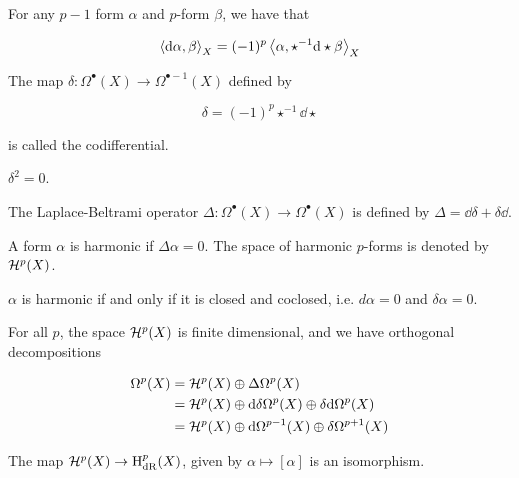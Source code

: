 \begin{lemma}
    For any \(p-1\) form \(\alpha\) and \(p\)-form \(\beta\), we have that

    \[\left\langle \dd\alpha, \beta \right\rangle_X = (-1)^p\left\langle \alpha, \star^{-1}\dd\star\beta \right\rangle_X\]
\end{lemma}

\begin{definition}
    [codifferential] The map \(\delta : \Omega^\bullet(X) \to \Omega^{\bullet-1}(X)\) defined by

    \[\delta = (-1)^p\star^{-1}\dd \star\]

    is called the codifferential.
\end{definition}

\begin{lemma}
    \(\delta^2 = 0\).
\end{lemma}

\begin{definition}
     The Laplace-Beltrami operator \(\Delta : \Omega^\bullet(X) \to \Omega^\bullet(X)\) is defined by \(\Delta = \dd\delta + \delta\dd\).

    A form \(\alpha\) is harmonic if \(\Delta\alpha = 0\). The space of harmonic \(p\)-forms is denoted by \(\mathcal{H}^p(X)\).
\end{definition}

\begin{lemma}
    \(\alpha\) is harmonic if and only if it is closed and coclosed, i.e. \(d\alpha = 0\) and \(\delta\alpha = 0\).
\end{lemma}

\begin{theorem}
     For all \(p\), the space \(\mathcal{H}^p(X)\) is finite dimensional, and we have orthogonal decompositions

    \begin{align*}
        \Omega^p(X) &= \mathcal{H}^p(X) \oplus \Delta\Omega^p(X) \\
        &= \mathcal{H}^p(X) \oplus \dd\delta\Omega^p(X) \oplus \delta \dd \Omega^p(X) \\
        &= \mathcal{H}^p(X) \oplus \dd \Omega^{p-1}(X) \oplus \delta \Omega^{p+1}(X)
    \end{align*}
\end{theorem}

\begin{theorem}
    The map \(\mathcal{H}^p(X) \to \mathrm{H}_\mathrm{dR}^p(X)\), given by \(\alpha \mapsto [\alpha]\) is an isomorphism.
\end{theorem}
